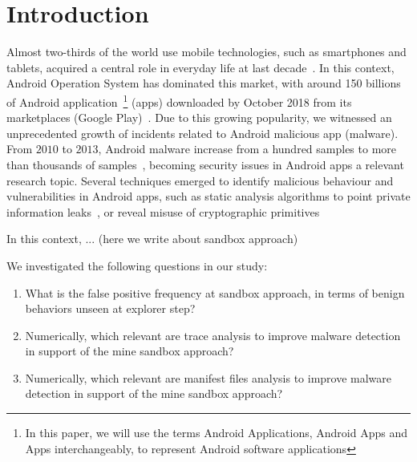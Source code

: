 \section{Introduction}\label{sec:introduction}

Almost two-thirds of the world use mobile technologies, such as smartphones and tablets, acquired a central role in everyday life at last decade~\cite{Comscore}\cite{DBLP:journals/tse/MartinSJZH17}. In this context, Android Operation System has dominated this market, with around 150 billions of Android application~\footnote{In this paper, we will use the terms Android Applications, Android Apps and Apps interchangeably, to represent Android software applications} (apps) downloaded by October 2018 from its marketplaces (Google Play)~\cite{Statista}. Due to this growing popularity, we witnessed an unprecedented growth of incidents related to Android malicious app (malware). From $2010$ to $2013$, Android malware increase from a hundred samples to more than thousands of samples~\cite{DBLP:journals/comsur/FarukiBLGGCR15,DBLP:journals/csur/SufatrioTCT15}, becoming security issues in Android apps a relevant research topic. Several techniques emerged to identify malicious behaviour and vulnerabilities in Android apps, such as static analysis algorithms to point private information leaks~\cite{DBLP:conf/pldi/ArztRFBBKTOM14}, or reveal misuse of 
cryptographic primitives~\cite{DBLP:journals/tse/KrugerSABM21}

In this context, ... (here we write about sandbox approach)


We investigated the following questions in our study:

\begin{enumerate}[(RQ1)]
 \item What is the false positive frequency at sandbox approach, in terms of benign behaviors unseen at explorer step?
 \item Numerically, which relevant are trace analysis to improve malware detection in support of the mine sandbox approach?
 \item Numerically, which relevant are manifest files analysis to improve malware detection in support of the mine sandbox approach?
\end{enumerate}